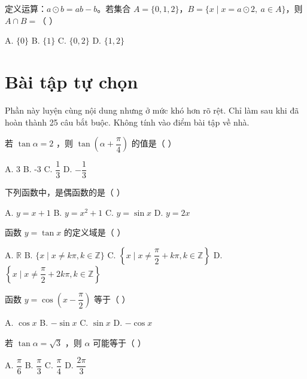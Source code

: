 \documentclass[11pt, a4paper]{article}
\begin{document}
\begin{baitap}[25]
定义运算：$a\odot b=ab-b$。若集合 $A=\{0,1,2\}$，$B=\{x\mid x=a\odot2,\ a\in A\}$，则 $A\cap B=$（ ）
\par\vspace{3pt}
\noindent A. $\{0\}$ \quad B. $\{1\}$ \quad C. $\{0,2\}$ \quad D. $\{1,2\}$
\end{baitap}

\clearpage
\section{Bài tập tự chọn}

Phần này luyện cùng nội dung nhưng ở mức khó hơn rõ rệt. Chỉ làm sau khi đã hoàn thành 25 câu bắt buộc. Không tính vào điểm bài tập về nhà.

\begin{baitap}[1]
若 $\tan\alpha = 2$ ，则 $\tan\!\left(\alpha + \dfrac{\pi}{4}\right)$ 的值是（ ）
\par\vspace{3pt}
\noindent A. 3 \quad B. -3 \quad C. $\dfrac{1}{3}$ \quad D. $-\dfrac{1}{3}$
\end{baitap}

\begin{baitap}[2]
下列函数中，是偶函数的是（ ）
\par\vspace{3pt}
\noindent A. $y = x + 1$ \quad B. $y = x^2 + 1$ \quad C. $y = \sin x$ \quad D. $y = 2x$
\end{baitap}

\begin{baitap}[3]
函数 $y = \tan x$ 的定义域是（ ）
\par\vspace{3pt}
\noindent A. $\mathbb{R}$ \quad B. $\{x \mid x \ne k\pi, k \in \mathbb{Z}\}$ \quad C. $\left\{x \mid x \ne \dfrac{\pi}{2} + k\pi, k \in \mathbb{Z}\right\}$ \quad D. $\left\{x \mid x \ne \dfrac{\pi}{2} + 2k\pi, k \in \mathbb{Z}\right\}$
\end{baitap}

\begin{baitap}[4]
函数 $y = \cos\!\left(x - \dfrac{\pi}{2}\right)$ 等于（ ）
\par\vspace{3pt}
\noindent A. $\cos x$ \quad B. $-\sin x$ \quad C. $\sin x$ \quad D. $-\cos x$
\end{baitap}

\begin{baitap}[5]
若 $\tan\alpha = \sqrt{3}$ ，则 $\alpha$ 可能等于（ ）
\par\vspace{3pt}
\noindent A. $\dfrac{\pi}{6}$ \quad B. $\dfrac{\pi}{3}$ \quad C. $\dfrac{\pi}{4}$ \quad D. $\dfrac{2\pi}{3}$
\end{baitap}
\end{document}
